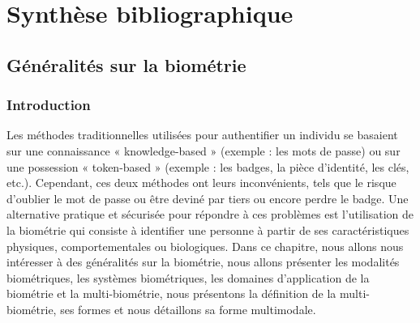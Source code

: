 \part{Synthèse bibliographique}
\label{part1}
\chapter{Généralités sur la biométrie}
\label{Chapter1} %

\section{Introduction}
\tab Les méthodes traditionnelles utilisées pour authentifier un individu se basaient sur une connaissance « knowledge-based » (exemple : les mots de passe) ou sur une possession « token-based » (exemple : les badges, la pièce d'identité, les clés, etc.). Cependant, ces deux méthodes ont leurs inconvénients, tels que le risque d'oublier le mot de passe ou être deviné par tiers ou encore perdre le badge.
Une alternative pratique et sécurisée pour répondre à ces problèmes est l'utilisation de la biométrie \citep{Perronnin2002} qui consiste à identifier une personne à partir de ses caractéristiques physiques, comportementales ou biologiques.
Dans ce chapitre, nous allons nous intéresser à des généralités sur la biométrie, nous allons présenter les modalités biométriques, les systèmes biométriques, les domaines d'application de la biométrie et la multi-biométrie, nous présentons la définition de la multi-biométrie, ses formes et nous détaillons sa forme multimodale.
